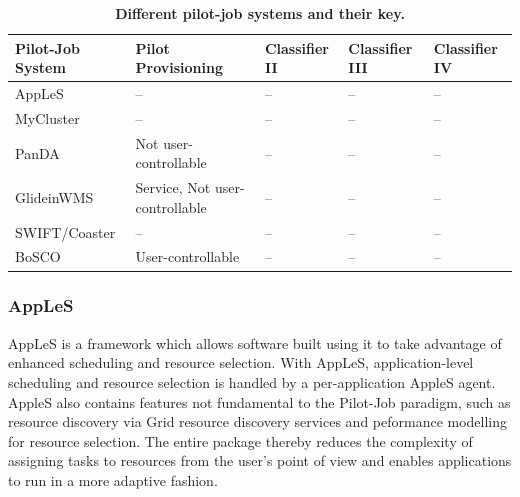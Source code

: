 \documentclass{sig-alternate}
\begin{document}


\begin{table}[t]
 \up
 \centering
 \begin{tabular}{|p{3cm}|p{3.2cm}|p{3cm}|p{3cm}|p{3cm}|}
  \hline
  \textbf{Pilot-Job System} &\textbf{Pilot Provisioning} &\textbf{Classifier II} &\textbf{Classifier III} &\textbf{Classifier IV}  \\
  \hline
          AppLeS            & --                   & --                    & --                     & --                     \\ 
  \hline
          MyCluster         & --                   & --                    & --                     & --                     \\ 
  \hline
          PanDA             & Not user-controllable                   & --                    & --                     & --                     \\ 
  \hline
          GlideinWMS        & Service, Not user-controllable                    & --                    & --                     & --                     \\ 
  \hline
          SWIFT/Coaster     & --                   & --                    & --                     & --                     \\ 
 \hline
          BoSCO             & User-controllable                   & --                    & --                     & --                     \\ 
 \hline
 \end{tabular}
 \caption{\textbf{Different pilot-job systems and their key. 
 }
 \up} 
 \label{table:bigjob-saga-diane}
\end{table}


%
\subsubsection{AppLeS}
AppLeS is a framework which allows software built using it to take advantage
of enhanced scheduling and resource selection.
With AppLeS, application-level scheduling and resource selection is handled by a
per-application AppleS agent.
AppleS also contains features not fundamental to the Pilot-Job paradigm, such
as resource discovery via Grid resource discovery services and peformance
modelling for resource selection.  The entire package thereby reduces the
complexity of assigning tasks to resources from the user's point of view
and enables applications to run in a more adaptive fashion.
\end{document}
